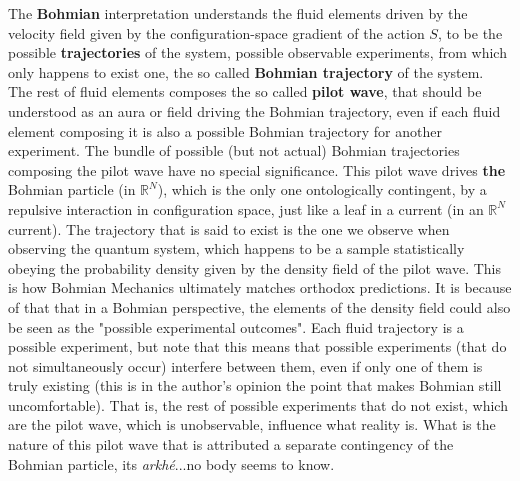 \documentclass[11pt, a4paper]{article} %
\newcommand{\R}{\mathbb{R}} %
\begin{document}
The {\bf Bohmian} interpretation understands the fluid elements driven by the velocity field given by the configuration-space gradient of the action $S$, to be the possible {\bf trajectories} of the system, possible observable experiments, from which only happens to exist one, the so called {\bf Bohmian trajectory} of the system. The rest of fluid elements composes the so called {\bf pilot wave}, that should be understood as an aura or field driving the Bohmian trajectory, even if each fluid element composing it is also a possible Bohmian trajectory for another experiment. The bundle of possible (but not actual) Bohmian trajectories composing the pilot wave have no special significance. This pilot wave drives {\bf the} Bohmian particle (in $\R^N$), which is the only one ontologically contingent, by a repulsive interaction in configuration space, just like a leaf in a current (in an $\R^N$ current). The trajectory that is said to exist is the one we observe when observing the quantum system, which happens to be a sample statistically obeying the probability density given by the density field of the pilot wave. This is how Bohmian Mechanics ultimately matches orthodox predictions. It is because of that that in a Bohmian perspective, the elements of the density field could also be seen as the "possible experimental outcomes". Each fluid trajectory is a possible experiment, but note that this means that possible experiments (that do not simultaneously occur) interfere between them, even if only one of them is truly existing (this is in the author's opinion the point that makes Bohmian still uncomfortable). That is, the rest of possible experiments that do not exist, which are the pilot wave, which is unobservable, influence what reality is. What is the nature of this pilot wave that is attributed a separate contingency of the Bohmian particle, its {\em arkhé}...no body seems to know.
\end{document}
